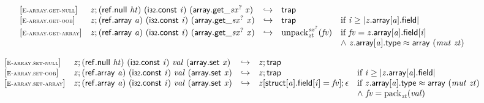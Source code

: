 \vspace{1ex}

$$
\begin{array}{@{}l@{}lcl@{}l@{}}
{[\textsc{\scriptsize E{-}array.get{-}null}]} \quad & {\mathit{z}} ; (\mathsf{ref.null}~{\mathit{ht}})~(\mathsf{i{\scriptstyle32}}.\mathsf{const}~{\mathit{i}})~({{\mathsf{array.get}}{\mathsf{\_}}}{{{\mathit{sx}}^?}}~{\mathit{x}}) &\hookrightarrow& \mathsf{trap} &  \\
{[\textsc{\scriptsize E{-}array.get{-}oob}]} \quad & {\mathit{z}} ; (\mathsf{ref.array}~{\mathit{a}})~(\mathsf{i{\scriptstyle32}}.\mathsf{const}~{\mathit{i}})~({{\mathsf{array.get}}{\mathsf{\_}}}{{{\mathit{sx}}^?}}~{\mathit{x}}) &\hookrightarrow& \mathsf{trap} &\quad
  \mbox{if}~{\mathit{i}} \geq {|{\mathit{z}}.\mathsf{array}{}[{\mathit{a}}].\mathsf{field}|} \\
{[\textsc{\scriptsize E{-}array.get{-}array}]} \quad & {\mathit{z}} ; (\mathsf{ref.array}~{\mathit{a}})~(\mathsf{i{\scriptstyle32}}.\mathsf{const}~{\mathit{i}})~({{\mathsf{array.get}}{\mathsf{\_}}}{{{\mathit{sx}}^?}}~{\mathit{x}}) &\hookrightarrow& {{{{\mathrm{unpack}}}_{{\mathit{zt}}}^{{{\mathit{sx}}^?}}}}{({\mathit{fv}})} &\quad
  \mbox{if}~{\mathit{fv}} = {\mathit{z}}.\mathsf{array}{}[{\mathit{a}}].\mathsf{field}{}[{\mathit{i}}] \\
 &&&&\quad {\land}~{\mathit{z}}.\mathsf{array}{}[{\mathit{a}}].\mathsf{type} \approx \mathsf{array}~({\mathit{mut}}~{\mathit{zt}}) \\
\end{array}
$$

\vspace{1ex}

$$
\begin{array}{@{}l@{}lcl@{}l@{}}
{[\textsc{\scriptsize E{-}array.set{-}null}]} \quad & {\mathit{z}} ; (\mathsf{ref.null}~{\mathit{ht}})~(\mathsf{i{\scriptstyle32}}.\mathsf{const}~{\mathit{i}})~{\mathit{val}}~(\mathsf{array.set}~{\mathit{x}}) &\hookrightarrow& {\mathit{z}} ; \mathsf{trap} &  \\
{[\textsc{\scriptsize E{-}array.set{-}oob}]} \quad & {\mathit{z}} ; (\mathsf{ref.array}~{\mathit{a}})~(\mathsf{i{\scriptstyle32}}.\mathsf{const}~{\mathit{i}})~{\mathit{val}}~(\mathsf{array.set}~{\mathit{x}}) &\hookrightarrow& {\mathit{z}} ; \mathsf{trap} &\quad
  \mbox{if}~{\mathit{i}} \geq {|{\mathit{z}}.\mathsf{array}{}[{\mathit{a}}].\mathsf{field}|} \\
{[\textsc{\scriptsize E{-}array.set{-}array}]} \quad & {\mathit{z}} ; (\mathsf{ref.array}~{\mathit{a}})~(\mathsf{i{\scriptstyle32}}.\mathsf{const}~{\mathit{i}})~{\mathit{val}}~(\mathsf{array.set}~{\mathit{x}}) &\hookrightarrow& {\mathit{z}}{}[\mathsf{struct}{}[{\mathit{a}}].\mathsf{field}{}[{\mathit{i}}] = {\mathit{fv}}] ; \epsilon &\quad
  \mbox{if}~{\mathit{z}}.\mathsf{array}{}[{\mathit{a}}].\mathsf{type} \approx \mathsf{array}~({\mathit{mut}}~{\mathit{zt}}) \\
 &&&&\quad {\land}~{\mathit{fv}} = {{\mathrm{pack}}}_{{\mathit{zt}}}({\mathit{val}}) \\
\end{array}
$$


